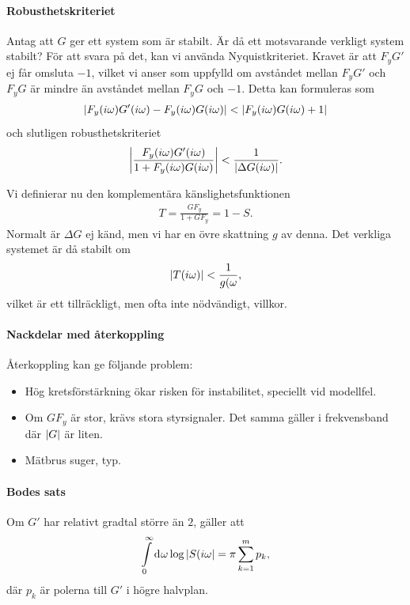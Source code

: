 \paragraph{Robusthetskriteriet}
Antag att $G$ ger ett system som är stabilt. Är då ett motsvarande verkligt system stabilt? För att svara på det, kan vi använda Nyquistkriteriet. Kravet är att $F_{y}G'$ ej får omsluta $-1$, vilket vi anser som uppfylld om avståndet mellan $F_{y}G'$ och $F_{y}G$ är mindre än avståndet mellan $F_{y}G$ och $-1$. Detta kan formuleras som
\begin{align*}
	\abs{F_{y}(i\omega)G'(i\omega) - F_{y}(i\omega)G(i\omega)} < \abs{F_{y}(i\omega)G(i\omega) + 1}
\end{align*}
och slutligen robusthetskriteriet
\begin{align*}
	\abs{\frac{F_{y}(i\omega)G'(i\omega)}{1 + F_{y}(i\omega)G(i\omega)}} < \frac{1}{\abs{\Delta G(i\omega)}}.
\end{align*}

Vi definierar nu den komplementära känslighetsfunktionen
\begin{align*}
	T = \frac{GF_{y}}{1 + GF_{y}} = 1 - S.
\end{align*}
Normalt är $\Delta G$ ej känd, men vi har en övre skattning $g$ av denna. Det verkliga systemet är då stabilt om
\begin{align*}
	\abs{T(i\omega)} < \frac{1}{g(\omega},
\end{align*}
vilket är ett tillräckligt, men ofta inte nödvändigt, villkor.

\paragraph{Nackdelar med återkoppling}
Återkoppling kan ge följande problem:
\begin{itemize}
	\item Hög kretsförstärkning ökar risken för instabilitet, speciellt vid modellfel.
	\item Om $GF_{y}$ är stor, krävs stora styrsignaler. Det samma gäller i frekvensband där $\abs{G}$ är liten.
	\item Mätbrus suger, typ.
\end{itemize}

\paragraph{Bodes sats}
Om $G'$ har relativt gradtal större än $2$, gäller att
\begin{align*}
	\int\limits_{0}^{\infty}\dd[]{\omega}\log{\abs{S(i\omega}} = \pi\sum\limits_{k = 1}^{m}p_{k},
\end{align*}
där $p_{k}$ är polerna till $G'$ i högre halvplan.
